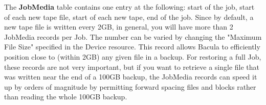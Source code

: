 {{{\begin{longtable}{|l|l|p{2.5in}|}
\end{longtable}

The {\bf JobMedia} table contains one entry at the following: start of
the job, start of each new tape file, start of each new tape, end of the
job.  Since by default, a new tape file is written every 2GB, in general,
you will have more than 2 JobMedia records per Job.  The number can be
varied by changing the "Maximum File Size" specified in the Device 
resource.  This record allows Bacula to efficiently position close to
(within 2GB) any given file in a backup.  For restoring a full Job,
these records are not very important, but if you want to retrieve
a single file that was written near the end of a 100GB backup, the   
JobMedia records can speed it up by orders of magnitude by permitting
forward spacing files and blocks rather than reading the whole 100GB
backup.
        



}}}
